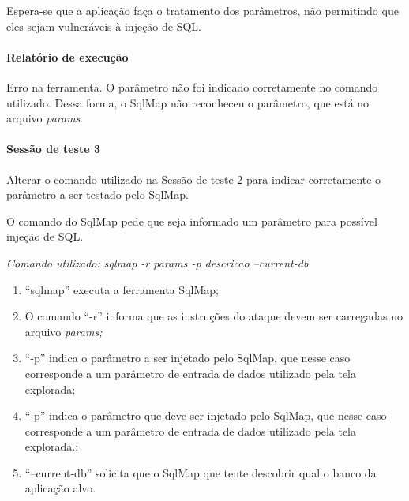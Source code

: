 \documentclass[
    12pt,               %
    openright,          %
    oneside,            %
    a4paper,            %
    section=TITLE,     %
    english,            %
    french,             %
    spanish,            %
    brazil              %
    ]{abntex2}
\begin{document}
Espera-se que a aplicação faça o tratamento dos parâmetros, não permitindo que eles sejam vulneráveis à injeção de SQL.



\paragraph*{Relatório de execução}

Erro na ferramenta. O parâmetro não foi indicado corretamente no comando utilizado. Dessa forma, o SqlMap não reconheceu o parâmetro, que está no arquivo \emph{params}.



\paragraph*{Sessão de teste 3}

Alterar o comando utilizado na Sessão de teste 2 para indicar corretamente o parâmetro a ser testado pelo SqlMap.


O comando do SqlMap pede que seja informado um parâmetro para possível injeção de SQL.


\emph{Comando utilizado: sqlmap -r params -p descricao --current-db}



\begin{enumerate}[start=1]
	
\item \textquotedblleft{}sqlmap\textquotedblright{} executa a ferramenta SqlMap;
	
\item O comando \textquotedblleft{}-r\textquotedblright{} informa que as instruções do ataque devem ser carregadas no arquivo \emph{params;}
	
\item \textquotedblleft{}-p\textquotedblright{} indica o parâmetro a ser injetado pelo SqlMap, que nesse caso corresponde a um parâmetro de entrada de dados utilizado pela tela explorada;
	
\item \textquotedblleft{}-p\textquotedblright{} indica o parâmetro que deve ser injetado pelo SqlMap, que nesse caso corresponde a um parâmetro de entrada de dados utilizado pela tela explorada.;
	
\item \textquotedblleft{}--current-db\textquotedblright{} solicita que o SqlMap que tente descobrir qual o banco da aplicação alvo.

\end{enumerate}
\end{document}
